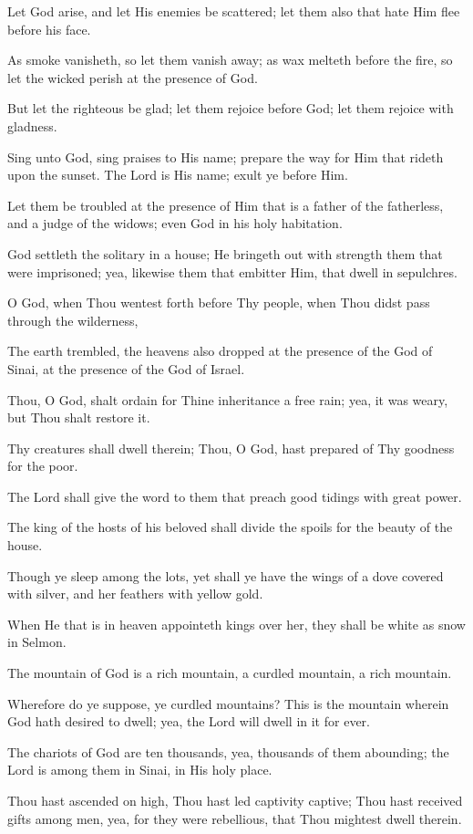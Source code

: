 Let God arise, and let His enemies be scattered; let them also that hate Him flee before his face.

As smoke vanisheth, so let them vanish away; as wax melteth before the fire, so let the wicked perish at the presence of God.

But let the righteous be glad; let them rejoice before God; let them rejoice with gladness.

Sing unto God, sing praises to His name; prepare the way for Him that rideth upon the sunset. The Lord is His name; exult ye before Him.

Let them be troubled at the presence of Him that is a father of the fatherless, and a judge of the widows; even God in his holy habitation.

God settleth the solitary in a house; He bringeth out with strength them that were imprisoned; yea, likewise them that embitter Him, that dwell in sepulchres.

O God, when Thou wentest forth before Thy people, when Thou didst pass through the wilderness,

The earth trembled, the heavens also dropped at the presence of the God of Sinai, at the presence of the God of Israel.

Thou, O God, shalt ordain for Thine inheritance a free rain; yea, it was weary, but Thou shalt restore it.

Thy creatures shall dwell therein; Thou, O God, hast prepared of Thy goodness for the poor.

The Lord shall give the word to them that preach good tidings with great power.

The king of the hosts of his beloved shall divide the spoils for the beauty of the house.

Though ye sleep among the lots, yet shall ye have the wings of a dove covered with silver, and her feathers with yellow gold.

When He that is in heaven appointeth kings over her, they shall be white as snow in Selmon.

The mountain of God is a rich mountain, a curdled mountain, a rich mountain.

Wherefore do ye suppose, ye curdled mountains? This is the mountain wherein God hath desired to dwell; yea, the Lord will dwell in it for ever.

The chariots of God are ten thousands, yea, thousands of them abounding; the Lord is among them in Sinai, in His holy place.

Thou hast ascended on high, Thou hast led captivity captive; Thou hast received gifts among men, yea, for they were rebellious, that Thou mightest dwell therein.

